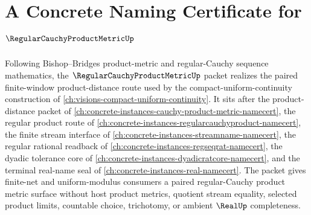 \chapter{A Concrete Naming Certificate for $\RegularCauchyProductMetricUp$}
\label{ch:concrete-instances-regular-cauchy-product-metric-namecert}

Following Bishop--Bridges product-metric and regular-Cauchy sequence mathematics, the $\RegularCauchyProductMetricUp$ packet realizes the paired finite-window product-distance route used by the compact-uniform-continuity construction of \autoref{ch:visions-compact-uniform-continuity}. It sits after the product-distance packet of \autoref{ch:concrete-instances-cauchy-product-metric-namecert}, the regular product route of \autoref{ch:concrete-instances-regularcauchyproduct-namecert}, the finite stream interface of \autoref{ch:concrete-instances-streamname-namecert}, the regular rational readback of \autoref{ch:concrete-instances-regseqrat-namecert}, the dyadic tolerance core of \autoref{ch:concrete-instances-dyadicratcore-namecert}, and the terminal real-name seal of \autoref{ch:concrete-instances-real-namecert}. The packet gives finite-net and uniform-modulus consumers a paired regular-Cauchy product metric surface without host product metrics, quotient stream equality, selected product limits, countable choice, trichotomy, or ambient $\RealUp$ completeness.

